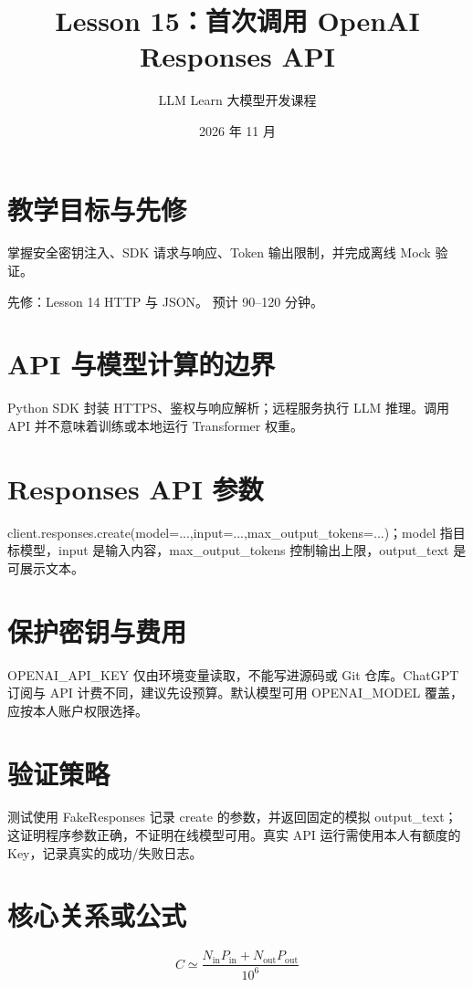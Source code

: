 \documentclass[UTF8,11pt,a4paper]{ctexart}
\begin{document}
\title{Lesson 15：首次调用 OpenAI Responses API}
\author{LLM Learn 大模型开发课程}
\date{2026 年 11 月}
\maketitle
\tableofcontents
\newpage
\section{教学目标与先修}
掌握安全密钥注入、SDK 请求与响应、Token 输出限制，并完成离线 Mock 验证。\par
先修：Lesson 14 HTTP 与 JSON。 预计 90–120 分钟。\par
\section{API 与模型计算的边界}
Python SDK 封装 HTTPS、鉴权与响应解析；远程服务执行 LLM 推理。调用 API 并不意味着训练或本地运行 Transformer 权重。

\section{Responses API 参数}
client.responses.create(model=...,input=...,max\_output\_tokens=...)；model 指目标模型，input 是输入内容，max\_output\_tokens 控制输出上限，output\_text 是可展示文本。

\section{保护密钥与费用}
OPENAI\_API\_KEY 仅由环境变量读取，不能写进源码或 Git 仓库。ChatGPT 订阅与 API 计费不同，建议先设预算。默认模型可用 OPENAI\_MODEL 覆盖，应按本人账户权限选择。

\section{验证策略}
测试使用 FakeResponses 记录 create 的参数，并返回固定的模拟 output\_text；这证明程序参数正确，不证明在线模型可用。真实 API 运行需使用本人有额度的 Key，记录真实的成功/失败日志。

\section{核心关系或公式}
\[
C\simeq\frac{N_{\mathrm{in}}P_{\mathrm{in}}+N_{\mathrm{out}}P_{\mathrm{out}}}{10^{6}}
\]
\end{document}
